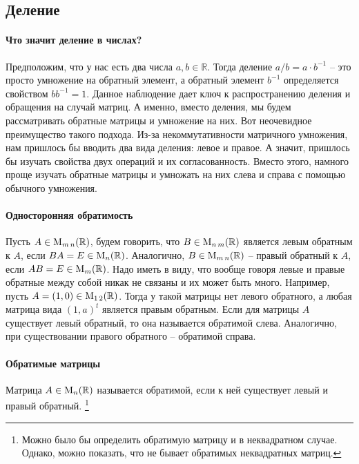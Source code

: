 \subsection{Деление}

\paragraph{Что значит деление в числах?}

Предположим, что у нас есть два числа $a,b\in\mathbb R$.
Тогда деление $a/b = a \cdot b^{-1}$ -- это просто умножение на обратный элемент, а обратный элемент $b^{-1}$ определяется свойством $b b^{-1} = 1$.
Данное наблюдение дает ключ к распространению деления и обращения на случай матриц.
А именно, вместо деления, мы будем рассматривать обратные матрицы и умножение на них.
Вот неочевидное преимущество такого подхода.
Из-за некоммутативности матричного умножения, нам пришлось бы вводить два вида деления: левое и правое.
А значит, пришлось бы изучать свойства двух операций и их согласованность.
Вместо этого, намного проще изучать обратные матрицы и умножать на них слева и справа с помощью обычного умножения.

\paragraph{Односторонняя обратимость}

Пусть $A\in\operatorname{M}_{m\,n}(\mathbb R)$, будем говорить, что $B\in\operatorname{M}_{n\,m}(\mathbb R)$ является левым обратным к $A$, если $BA = E\in\operatorname{M}_{n}(\mathbb R)$.
Аналогично, $B\in\operatorname{M}_{m\,n}(\mathbb R)$ -- правый обратный к $A$, если $AB = E\in\operatorname{M}_{m}(\mathbb R)$.
Надо иметь в виду, что вообще говоря левые и правые обратные между собой никак не связаны и их может быть много.
Например, пусть $A = (1, 0)\in\operatorname{M}_{1\,2}(\mathbb R)$.
Тогда у такой матрицы нет левого обратного, а любая матрица вида $(1, a)^t$ является правым обратным.
Если для матрицы $A$ существует левый обратный, то она называется обратимой слева.
Аналогично, при существовании правого обратного -- обратимой справа.

\paragraph{Обратимые матрицы}

Матрица $A\in\operatorname{M}_{n}(\mathbb R)$ называется обратимой, если к ней существует левый и правый обратный.%
\footnote{Можно было бы определить обратимую матрицу и в неквадратном случае.
Однако, можно показать, что не бывает обратимых неквадратных матриц.}

